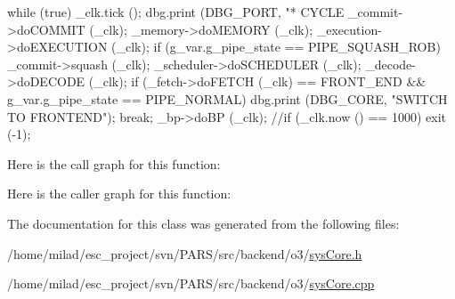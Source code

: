\begin{DoxyCode}
                          {
        while (true) {
                _clk.tick ();
        dbg.print (DBG_PORT, "\n** CYCLE %
            _commit->doCOMMIT (_clk);
            _memory->doMEMORY (_clk);
            _execution->doEXECUTION (_clk);
        if (g_var.g_pipe_state == PIPE_SQUASH_ROB) _commit->squash (_clk);
            _scheduler->doSCHEDULER (_clk);
            _decode->doDECODE (_clk);
            if (_fetch->doFETCH (_clk) == FRONT_END && g_var.g_pipe_state == 
      PIPE_NORMAL) {
            dbg.print (DBG_CORE, "SWITCH TO FRONTEND\n");
            break;
        }
        _bp->doBP (_clk);
        //if (_clk.now () == 1000) exit (-1);
        }
}
\end{DoxyCode}


Here is the call graph for this function:




Here is the caller graph for this function:




The documentation for this class was generated from the following files:\begin{DoxyCompactItemize}
\item 
/home/milad/esc\_\-project/svn/PARS/src/backend/o3/\hyperlink{o3_2sysCore_8h}{sysCore.h}\item 
/home/milad/esc\_\-project/svn/PARS/src/backend/o3/\hyperlink{o3_2sysCore_8cpp}{sysCore.cpp}\end{DoxyCompactItemize}
